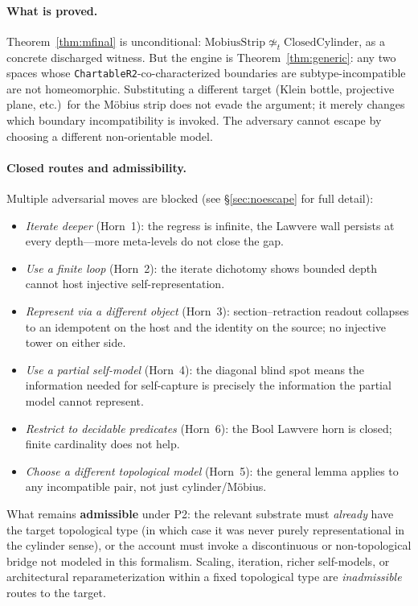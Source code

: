 \documentclass[11pt]{article}
\begin{document}
\paragraph{What is proved.}
Theorem~\ref{thm:mfinal} is unconditional:
$\mathrm{MobiusStrip} \not\simeq_t \mathrm{ClosedCylinder}$, as a concrete
discharged witness.  But the engine is
Theorem~\ref{thm:generic}: any two spaces whose
\texttt{ChartableR2}-co-characterized boundaries are subtype-incompatible
are not homeomorphic.  Substituting a different target (Klein bottle,
projective plane, etc.)\ for the M\"obius strip does not evade the
argument; it merely changes which boundary incompatibility is invoked.
The adversary cannot escape by choosing a different non-orientable model.

\paragraph{Closed routes and admissibility.}
Multiple adversarial moves are blocked (see \S\ref{sec:noescape}
for full detail):
\begin{itemize}[leftmargin=1.5em,itemsep=0pt,topsep=0.3ex,parsep=0pt]
\item \emph{Iterate deeper} (Horn~1): the regress is infinite, the Lawvere
  wall persists at every depth---more meta-levels do not close the gap.
\item \emph{Use a finite loop} (Horn~2): the iterate dichotomy shows
  bounded depth cannot host injective self-representation.
\item \emph{Represent via a different object} (Horn~3): section--retraction
  readout collapses to an idempotent on the host and the identity on the
  source; no injective tower on either side.
\item \emph{Use a partial self-model} (Horn~4): the diagonal blind spot
  means the information needed for self-capture is precisely the
  information the partial model cannot represent.
\item \emph{Restrict to decidable predicates} (Horn~6): the $\mathrm{Bool}$
  Lawvere horn is closed; finite cardinality does not help.
\item \emph{Choose a different topological model} (Horn~5): the general
  lemma applies to any incompatible pair, not just cylinder/M\"obius.
\end{itemize}
What remains \textbf{admissible} under P2: the relevant substrate must
\emph{already} have the target topological type (in which case it was
never purely representational in the cylinder sense), or the account
must invoke a discontinuous or non-topological bridge not modeled in
this formalism.  Scaling, iteration, richer self-models, or architectural
reparameterization within a fixed topological type are \emph{inadmissible}
routes to the target.
\end{document}
